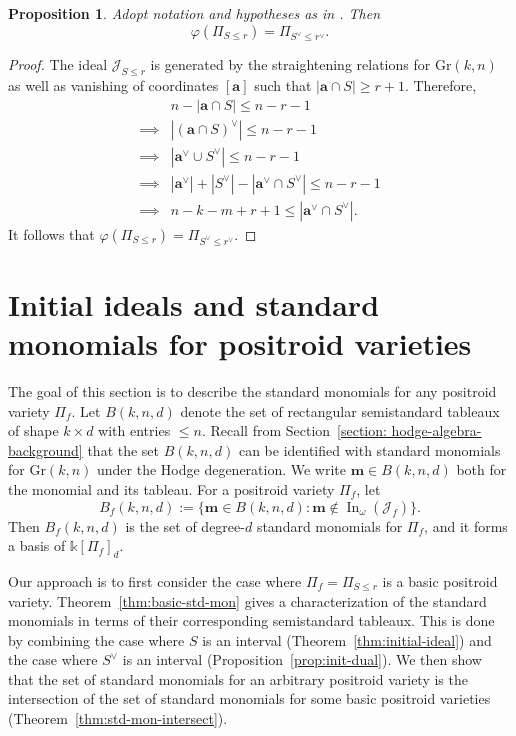 \documentclass[12pt,reqno]{amsart}
\newtheorem{prop}[lemma]{Proposition}
\theoremstyle{definition}
\newcommand{\inn}{\operatorname{In}}
\renewcommand{\aa}{\mathbf a}
\newcommand{\mm}{\mathbf m}
\renewcommand{\k}{\mathbb{k}}
\newcommand{\cJ}{\mathcal{J}}
\newcommand{\gr}{\mathrm{Gr}}
\begin{document}
{\begin{prop}
    \label{prop:basic-dual}
    Adopt notation and hypotheses as in . Then
    $$\varphi(\Pi_{S\le r})=\Pi_{S^\vee\le r^\vee}.$$
\end{prop}

\begin{proof}
    The ideal $\cJ_{S\le r}$ is generated by the straightening relations for $\gr(k,n)$ as well as vanishing of coordinates $[\aa]$ such that $|\aa\cap S|\ge r+1$. Therefore,
    \begin{align*}
        & n-|\aa\cap S| \le n-r-1 \\
        \implies & |(\aa\cap S)^\vee |\le n-r-1 \\
        \implies & |\aa^\vee \cup S^\vee |\le n-r-1 \\
        \implies &|\aa^\vee| + |S^\vee| - |\aa^\vee \cap S^\vee| \le n-r-1 \\
        \implies &n-k-m+r+1\le |\aa^\vee \cap S^\vee|.
    \end{align*}
    It follows that $\varphi(\Pi_{S\le r})=\Pi_{S^\vee\le r^\vee}$.
\end{proof}


\section{Initial ideals and standard monomials for positroid varieties}\label{section: initial-ideal}
The goal of this section is to describe the standard monomials for any positroid variety $\Pi_f$. Let $B(k,n,d)$ denote the set of rectangular semistandard tableaux of shape $k\times d$ with entries $\le n$. Recall from Section~\ref{section: hodge-algebra-background} that the set $B(k,n,d)$ can be identified with standard monomials for $\gr(k,n)$ under the Hodge degeneration. We write $\mm\in B(k,n,d)$ both for the monomial and its tableau. For a positroid variety $\Pi_f$, let\[B_f(k,n,d):=\{\mm\in B(k,n,d): \mm \not\in \inn_\omega(\cJ_f) \}.\]
Then $B_f(k,n,d)$ is the set of degree-$d$ standard monomials for $\Pi_f$, and it forms a basis of $\k[\Pi_f]_d$.

Our approach is to first consider the case where $\Pi_f = \Pi_{S\leq r}$ is a basic positroid variety. 
Theorem~\ref{thm:basic-std-mon} gives a characterization of the standard monomials in terms of their corresponding semistandard tableaux. This is done by combining the case where $S$ is an interval (Theorem~\ref{thm:initial-ideal}) and the case where $S^\vee$ is an interval (Proposition~\ref{prop:init-dual}). 
We then show that the set of standard monomials for an arbitrary positroid variety is the intersection of the set of standard monomials for some basic positroid varieties (Theorem~\ref{thm:std-mon-intersect}).

}
\end{document}
